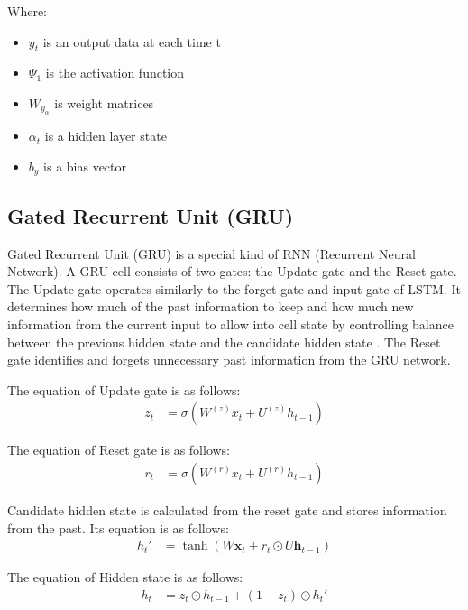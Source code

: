 \documentclass{ieeeojies}
\begin{document}
Where:\\
    \begin{itemize}
        \item $y_t$ is an output data at each time t
        \item $\Psi_1$ is the activation function
        \item $W_y_\alpha$ is weight matrices
        \item $\alpha_t$ is a hidden layer state
        \item $b_y$ is a bias vector
        \cite{zargar2021introduction}
    \end{itemize}

\subsection{Gated Recurrent Unit (GRU)} 
Gated Recurrent Unit (GRU) is a special kind of RNN (Recurrent Neural Network). A GRU cell consists of two gates: the Update gate and the Reset gate. The Update gate operates similarly to the forget gate and input gate of LSTM. It determines how much of the past information to keep and how much new information from the current input to allow into cell state by controlling balance between the previous hidden state and the candidate hidden state \cite{gru_balance}. The Reset gate identifies and forgets unnecessary past information from the GRU network.

The equation of Update gate is as follows:
\begin{align*}
z_t &= \sigma\left( W^{(z)} x_t + U^{(z)} h_{t-1} \right)
\end{align*}

The equation of Reset gate is as follows:
\begin{align*}
r_t &= \sigma\left( W^{(r)} x_t + U^{(r)} h_{t-1} \right)
\end{align*}

Candidate hidden state is calculated from the reset gate and stores information from the past. Its equation is as follows:
\begin{align*}
h_t' &= \tanh(W \mathbf{x}_t + r_t \odot U \mathbf{h}_{t-1})
\end{align*}

The equation of Hidden state is as follows:
\begin{align*}
h_t &= z_t \odot h_{t-1} + (1 - z_t) \odot h_t'  
\end{align*}
\end{document}
